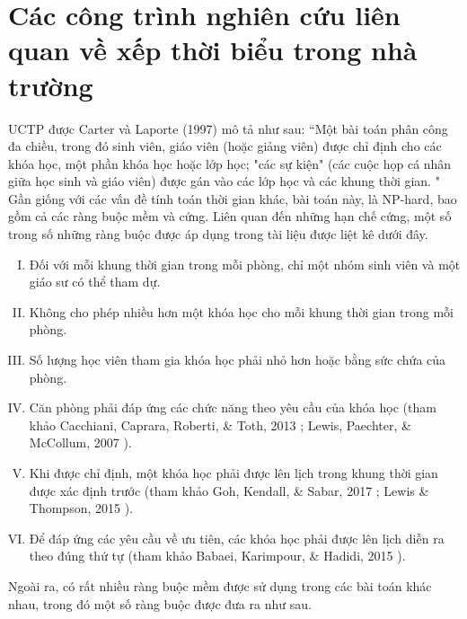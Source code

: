 \documentclass[11pt]{article}
\begin{document}
\section{\texorpdfstring{Các công trình nghiên cứu liên quan về xếp thời biểu trong nhà trường}{Related works of UCTP}}

UCTP được Carter và Laporte (1997) \cite{Carter:Laporte:1997} mô tả như sau: “Một bài toán phân công đa chiều, trong đó sinh viên, giáo viên (hoặc giảng viên) được chỉ định cho các khóa học, một phần khóa học hoặc lớp học; "các sự kiện" (các cuộc họp cá nhân giữa học sinh và giáo viên) được gán vào các lớp học và các khung thời gian. " Gần giống với các vấn đề tính toán thời gian khác, bài toán này, là NP-hard, bao gồm cả các ràng buộc mềm và cứng. Liên quan đến những hạn chế cứng, một số trong số những ràng buộc được áp dụng trong tài liệu được liệt kê dưới đây.

\begin{enumerate}[I.]
\item Đối với mỗi khung thời gian trong mỗi phòng, chỉ một nhóm sinh viên và một giáo sư có thể tham dự.

\item Không cho phép nhiều hơn một khóa học cho mỗi khung thời gian trong mỗi phòng.

\item Số lượng học viên tham gia khóa học phải nhỏ hơn hoặc bằng sức chứa của phòng.

\item Căn phòng phải đáp ứng các chức năng theo yêu cầu của khóa học (tham khảo Cacchiani, Caprara, Roberti, \& Toth, 2013 \cite{Cacchiani:al:2013}; Lewis, Paechter, \& McCollum, 2007 \cite{Lewis:al:2007}).

\item Khi được chỉ định, một khóa học phải được lên lịch trong khung thời gian được xác định trước (tham khảo Goh, Kendall, \& Sabar, 2017 \cite{Goh:al:2017}; Lewis \& Thompson, 2015 \cite{Lewis:Thompson:2015}).

\item Để đáp ứng các yêu cầu về ưu tiên, các khóa học phải được lên lịch diễn ra theo đúng thứ tự (tham khảo Babaei, Karimpour, \& Hadidi, 2015 \cite{Babaei:al:2015}).
\end{enumerate}

Ngoài ra, có rất nhiều ràng buộc mềm được sử dụng trong các bài toán khác nhau, trong đó một số ràng buộc được đưa ra như sau.
\end{document}
